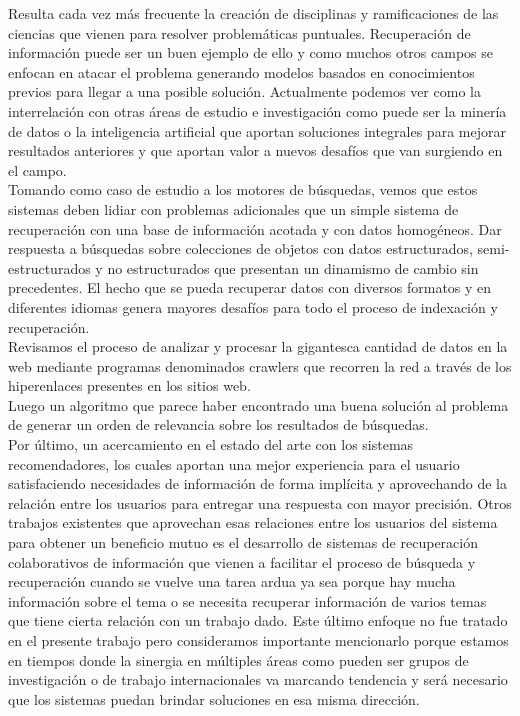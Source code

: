 Resulta cada vez más frecuente la creación de disciplinas y ramificaciones de las ciencias que vienen para resolver problemáticas puntuales. Recuperación de información puede ser un buen ejemplo de ello y como muchos otros campos se enfocan en atacar el problema generando modelos basados en conocimientos previos para llegar a una posible solución. Actualmente podemos ver como la interrelación con otras áreas de estudio e investigación como puede ser la minería de datos o la inteligencia artificial que aportan soluciones integrales para mejorar resultados anteriores y que aportan valor a nuevos desafíos que van surgiendo en el campo. \\
Tomando como caso de estudio a los motores de búsquedas, vemos que estos sistemas deben lidiar con problemas adicionales que un simple sistema de recuperación con una base de información acotada y con datos homogéneos. Dar respuesta a búsquedas sobre colecciones de objetos con datos estructurados, semi-estructurados y no estructurados que presentan un dinamismo de cambio sin precedentes. El hecho que se pueda recuperar datos con diversos formatos y en diferentes idiomas genera mayores desafíos para todo el proceso de indexación y recuperación.  \\
Revisamos el proceso de analizar y procesar la gigantesca cantidad de datos en la web mediante programas denominados crawlers que recorren la red a través de los hiperenlaces presentes en los sitios web. \\
Luego un algoritmo que parece haber encontrado una buena solución al problema de generar un orden de relevancia sobre los resultados de búsquedas. \\
Por último, un acercamiento en el estado del arte con los sistemas recomendadores, los  cuales aportan una mejor experiencia para el usuario satisfaciendo necesidades de información de forma implícita y aprovechando de la relación entre los usuarios para entregar una respuesta con mayor precisión. Otros trabajos existentes que aprovechan esas relaciones entre los usuarios del sistema para obtener un beneficio mutuo es el desarrollo de sistemas de recuperación colaborativos de información que vienen a facilitar el proceso de búsqueda y recuperación cuando se vuelve una tarea ardua ya sea porque hay mucha información sobre el tema o se necesita recuperar información de varios temas que tiene cierta relación con un trabajo dado. Este último enfoque no fue tratado en el presente trabajo pero consideramos importante mencionarlo porque estamos en tiempos donde la sinergia en múltiples áreas como pueden ser grupos de investigación o de trabajo internacionales va marcando tendencia y será necesario que los sistemas puedan brindar soluciones en esa misma dirección.